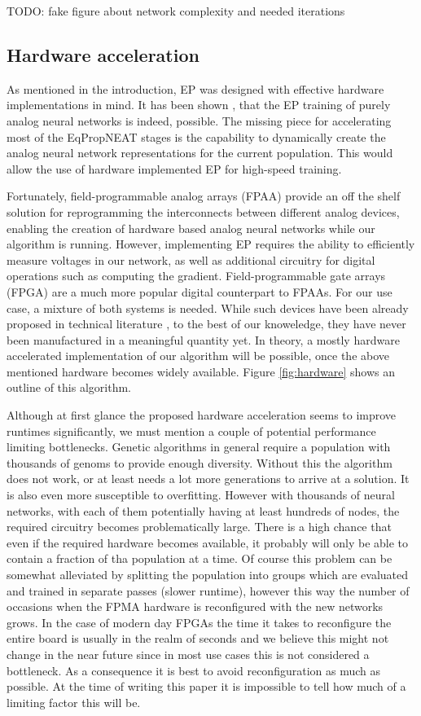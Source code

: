 \documentclass[lettersize,journal]{IEEEtran}
\newcommand{\eqprop}{EP }
\begin{document}
TODO: fake figure about network complexity and needed iterations

\subsection{Hardware acceleration}
As mentioned in the introduction, \eqprop was designed with effective hardware implementations in mind. It has been shown \cite{hardware_eq}, that the \eqprop training of purely analog neural networks is indeed, possible. The missing piece for accelerating most of the EqPropNEAT stages is the capability to dynamically create the analog neural network representations for the current population. This would allow the use of hardware implemented \eqprop for high-speed training. 

Fortunately, field-programmable analog arrays (FPAA) provide an off the shelf solution for reprogramming the interconnects between different analog devices, enabling the creation of hardware based analog neural networks while our algorithm is running. However, implementing \eqprop requires the ability to efficiently measure voltages in our network, as well as additional circuitry for digital operations such as computing the gradient. Field-programmable gate arrays (FPGA) are a much more popular digital counterpart to FPAAs. For our use case, a mixture of both systems is needed. While such devices have been already proposed in technical literature \cite{fgbfpmsa}, to the best of our knoweledge, they have never been manufactured in a meaningful quantity yet. In theory, a mostly hardware accelerated implementation of our algorithm will be possible, once the above mentioned hardware becomes widely available. Figure \ref{fig:hardware} shows an outline of this algorithm. 

Although at first glance the proposed hardware acceleration seems to improve runtimes significantly, we must mention a couple of potential performance limiting bottlenecks. Genetic algorithms in general require a population with thousands of genoms to provide enough diversity. Without this the algorithm does not work, or at least needs a lot more generations to arrive at a solution. It is also even more susceptible to overfitting. However with thousands of neural networks, with each of them potentially having at least hundreds of nodes, the required circuitry becomes problematically large. There is a high chance that even if the required hardware becomes available, it probably will only be able to contain a fraction of tha population at a time. Of course this problem can be somewhat alleviated by splitting the population into groups which are evaluated and trained in separate passes (slower runtime), however this way the number of occasions when the FPMA hardware is reconfigured with the new networks grows. In the case of modern day FPGAs the time it takes to reconfigure the entire board is usually in the realm of seconds and we believe this might not change in the near future since in most use cases this is not considered a bottleneck. As a consequence it is best to avoid reconfiguration as much as possible. At the time of writing this paper it is impossible to tell how much of a limiting factor this will be.
\end{document}
